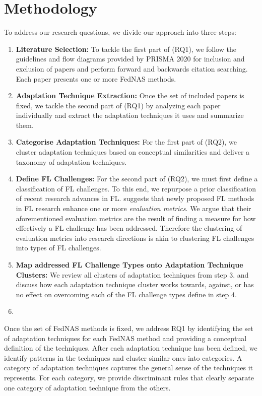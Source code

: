 \section{Methodology}

To address our research questions, we divide our approach into three steps:

\begin{enumerate}
    \item \textbf{Literature Selection:} To tackle the first part of (RQ1), we follow the guidelines and flow diagrams provided by PRISMA 2020 \cite{prisma_2020} for inclusion and exclusion of papers and perform forward and backwards citation searching. Each paper presents one or more FedNAS methods. 
    \item \textbf{Adaptation Technique Extraction:} Once the set of included papers is fixed, we tackle the second part of (RQ1) by analyzing each paper individually and extract the adaptation techniques it uses and summarize them.
    \item \textbf{Categorise Adaptation Techniques:} For the first part of (RQ2), we cluster adaptation techniques based on conceptual similarities and deliver a taxonomy of adaptation techniques.
    \item \textbf{Define FL Challenges:} For the second part of (RQ2), we must first define a classification of FL challenges. To this end, we repurpose a prior classification \cite{fl_taxonomy_2024} of recent research advances in FL. \cite{fl_taxonomy_2024} suggests that newly proposed FL methods in FL research enhance one or more \textit{evaluation metrics}. We argue that their aforementioned evaluation metrics are the result of finding a measure for how effectively a FL challenge has been addressed. Therefore the clustering of evaluation metrics into research directions is akin to clustering FL challenges into types of FL challenges.
    \item \textbf{Map addressed FL Challenge Types onto Adaptation Technique Clusters:} We review all clusters of adaptation techniques from step 3. and discuss how each adaptation technique cluster works towards, against, or has no effect on overcoming each of the FL challenge types define in step 4.
    \item 

\end{enumerate}

Once the set of FedNAS methods is fixed, we address RQ1 by identifying the set of adaptation techniques for each FedNAS method and providing a conceptual definition of the techniques. After each adaptation technique has been defined, we identify patterns in the techniques and cluster similar ones into categories. A category of adaptation techniques captures the general sense of the techniques it represents. For each category, we provide discriminant rules that clearly separate one category of adaptation technique from the others.

